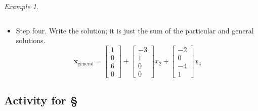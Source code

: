 \documentclass[11pt,oneside]{amsbook}
\theoremstyle{definition}
\theoremstyle{plain}
\theoremstyle{definition}
\theoremstyle{remark}
\newtheorem{example}[theorem]{Example}
\numberwithin{equation}{section}
\numberwithin{figure}{section}
\begin{document}
\begin{example}
\begin{itemize}
\[  \]
  \item Step four. Write the solution; it is just the sum of the particular and general solutions.
    \[\mathbf{x}_{\mathrm{general}}
      =\begin{bmatrix}1\\0\\6\\0\end{bmatrix}
      +\begin{bmatrix}-3\\1\\0\\0\end{bmatrix}x_2
      +\begin{bmatrix}-2\\0\\-4\\1\end{bmatrix}x_4
    \]
  \end{itemize}
\end{example}

\newpage
\subsection*{Activity for \S \thesection}
\end{document}
